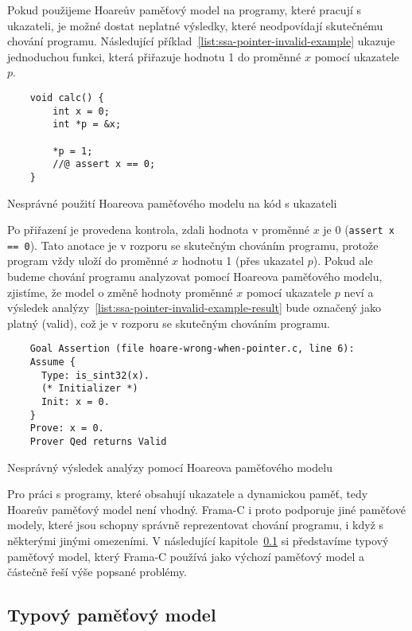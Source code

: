 Pokud použijeme Hoareův paměťový model na programy, které pracují s ukazateli,
je možné dostat neplatné výsledky, které neodpovídají skutečnému chování programu.
Následující příklad~\ref{list:ssa-pointer-invalid-example} ukazuje jednoduchou funkci,
která přiřazuje hodnotu 1 do proměnné $x$ pomocí ukazatele $p$.

\begin{listing}[H]
    \begin{verbatim}
    void calc() {
        int x = 0;
        int *p = &x;

        *p = 1;
        //@ assert x == 0;
    }
    \end{verbatim}
    \caption{Nesprávné použití Hoareova paměťového modelu na kód s ukazateli}
    \label{list:ssa-pointer-invalid-example}
\end{listing}

Po přiřazení je provedena kontrola, zdali hodnota v proměnné $x$ je 0 (\texttt{assert x == 0}).
Tato anotace je v rozporu se skutečným chováním programu,
protože program vždy uloží do proměnné $x$ hodnotu 1 (přes ukazatel $p$).
Pokud ale budeme chování programu analyzovat pomocí Hoareova paměťového modelu,
zjistíme, že model o změně hodnoty proměnné $x$ pomocí ukazatele $p$ neví
a výsledek analýzy~\ref{list:ssa-pointer-invalid-example-result} bude označený jako platný (valid),
což je v rozporu se skutečným chováním programu.

\begin{listing}[H]
    \begin{verbatim}
    Goal Assertion (file hoare-wrong-when-pointer.c, line 6):
    Assume {
      Type: is_sint32(x).
      (* Initializer *)
      Init: x = 0.
    }
    Prove: x = 0.
    Prover Qed returns Valid
    \end{verbatim}
    \caption{Nesprávný výsledek analýzy pomocí Hoareova paměťového modelu}
    \label{list:ssa-pointer-invalid-example-result}
\end{listing}

Pro práci s programy, které obsahují ukazatele a dynamickou paměť, tedy Hoareův paměťový model není vhodný.
Frama\mbox{-}C i proto podporuje jiné paměťové modely,
které jsou schopny správně reprezentovat chování programu, i když s některými jinými omezeními.
V následující kapitole~\ref{subsec:typovy-pametovy-model} si představíme typový paměťový model,
který Frama\mbox{-}C používá jako výchozí paměťový model a částečně řeší výše popsané problémy.

\subsection{Typový paměťový model}
\label{subsec:typovy-pametovy-model}

